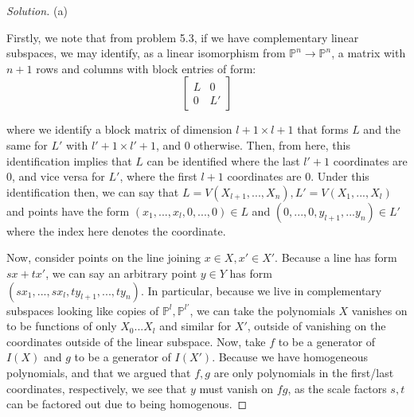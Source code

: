 \documentclass[10pt]{article}
\begin{document}
\begin{proof}[Solution]

(a)

Firstly, we note that from problem 5.3, if we have complementary linear subspaces, we may identify, as a linear isomorphism from $\mathbb{P}^n \to \mathbb{P}^n$, a matrix with $n+1$ rows and columns with block entries of form:
$$
    \left[ 
    \begin{array}{c|c} 
      L & 0 \\ 
      \hline 
      0 & L' 
    \end{array} 
    \right] 
$$

where we identify a block matrix of dimension $l+1 \times l+1$ that forms $L$ and the same for $L'$ with $l' + 1 \times l' +1$, and $0$ otherwise. Then, from here, this identification implies that $L$ can be identified where the last $l'+ 1$ coordinates are 0, and vice versa for $L'$, where the first $l + 1$ coordinates are $0$. Under this identification then, we can say that $L = V(X_{l + 1},...,X_n), L' = V(X_1,...,X_l)$ and points have the form $(x_1,...,x_l,0,...,0) \in L$ and $(0,...,0,y_{l+1},...y_n) \in L'$ where the index here denotes the coordinate.


Now, consider points on the line joining $x \in X, x' \in X'$. Because a line has form $sx + tx'$, we can say an arbitrary point $y \in Y$ has form $(sx_1,...,sx_l,t y_{l+1},...,t y_n)$. In particular, because we live in complementary subspaces looking like copies of $\mathbb{P}^l, \mathbb{P}^{l'}$, we can take the polynomials $X$ vanishes on to be functions of only $X_0...X_l$ and similar for $X'$, outside of vanishing on the coordinates outside of the linear subspace. Now, take $f$ to be a generator of $I(X)$ and $g$ to be a generator of $I(X')$. Because we have homogeneous polynomials, and that we argued that $f,g$ are only polynomials in the first/last coordinates, respectively, we see that $y$ must vanish on $fg$, as the scale factors $s,t$ can be factored out due to being homogenous.


\end{proof}
\end{document}
